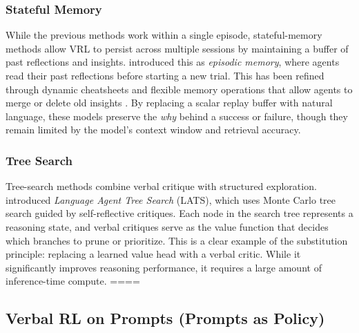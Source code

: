 \subsubsection{Stateful Memory}

While the previous methods work within a single episode, stateful-memory methods allow VRL to persist across multiple sessions by maintaining a buffer of past reflections and insights. \citet{shinn2023reflexion} introduced this as \textit{episodic memory}, where agents read their past reflections before starting a new trial. This has been refined through dynamic cheatsheets \citep{suzgun2026dynamic} and flexible memory operations that allow agents to merge or delete old insights \citep{cai2025flex, wang2026memento2, zhao2024expel}. By replacing a scalar replay buffer with natural language, these models preserve the \textit{why} behind a success or failure, though they remain limited by the model's context window and retrieval accuracy.

\subsubsection{Tree Search}

Tree-search methods combine verbal critique with structured exploration. \citet{zhou2024lats} introduced \textit{Language Agent Tree Search} (LATS), which uses Monte Carlo tree search guided by self-reflective critiques. Each node in the search tree represents a reasoning state, and verbal critiques serve as the value function that decides which branches to prune or prioritize. This is a clear example of the substitution principle: replacing a learned value head with a verbal critic. While it significantly improves reasoning performance, it requires a large amount of inference-time compute. =={\color{red}\citet{yao2023tree}}==

\subsection{Verbal RL on Prompts (Prompts as Policy)}
\label{sec:branchC}

